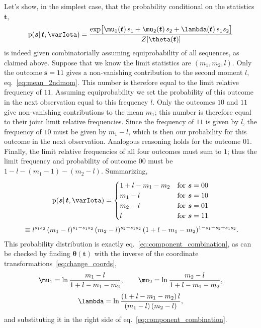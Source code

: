 \documentclass[\ifafour a4paper,12pt,\else a5paper,10pt,\fi%
onecolumn,oneside,article,%
british%
]{memoir}
\theoremstyle{remark}
\theoremstyle{innote}
\newcommand*{\pf}{\mathrm{p}}%
\renewcommand*{\|}{\mathpunct{|}}
\newcommand*{\eqn}{eq.}%
\newcommand*{\yI}{\varIota}
\newcommand*{\ys}{\bm{s}}
\newcommand*{\yso}[1]{\ys^{(#1)}}
\newcommand*{\la}{\lambda}
\newcommand*{\yth}{\bm{\theta}}
\newcommand*{\yt}{\bm{t}}
\begin{document}
Let's show, in the simplest case, that the probability conditional on
the statistics $\yt$,
\begin{equation}
  \label{eq:component_combination}
  \pf(\ys \|\yt, \yI )
  =
  \frac{  \exp\bigl[
    \mu_1(\yt)\, s_1 + \mu_2(\yt)\, s_2 + \la(\yt)\, s_1 s_2
    \bigr] }{Z[\yth(\yt)]}
\end{equation}
is indeed given combinatorially assuming equiprobability of all sequences,
as claimed above. Suppose that we know the limit statistics are
$(m_1, m_2, l)$. Only the outcome $\ys=11$ gives a non-vanishing
contribution to the second moment $l$, \eqn~\eqref{eq:mean_2ndmom}. This
number is therefore equal to the limit relative frequency of $11$. Assuming
equiprobability we set the probability of this outcome in the next
observation equal to this frequency $l$. Only the outcomes $10$ and $11$
give non-vanishing contributions to the mean $m_1$; this number is
therefore equal to their joint limit relative frequencies. Since the
frequency of $11$ is given by $l$, the frequency of $10$ must be given by
$m_1-l$, which is then our probability for this outcome in the next
observation. Analogous reasoning holds for the outcome $01$. Finally, the
limit relative frequencies of all four outcomes must sum to $1$; thus the
limit frequency and probability of outcome $00$ must be
$1-l-(m_1-1)-(m_2-l)$. Summarizing,
\begin{multline}
  \label{eq:prob_outcome_from_statistics}
  \pf(\ys \| \yt,\yI) =
  \begin{cases}
    1+l-m_1-m_2 &\text{for } \ys=00\\
    m_1-l &\text{for } \ys=10\\
    m_2-l &\text{for } \ys=01\\
    l &\text{for } \ys=11
  \end{cases}
  \\[\jot]
  {}\equiv
    l^{s_1 s_2}\,
  (m_1-l)^{s_1-s_1 s_2}\,
  (m_2-l)^{s_2-s_1 s_2}\,
  (1+l-m_1-m_2)^{1-s_1-s_2+s_1 s_2}.
\end{multline}
This probability distribution is exactly
\eqn~\eqref{eq:component_combination}, as can be checked by finding
$\yth(\yt)$ with the inverse of the coordinate
transformations~\eqref{eq:change_coords},
\begin{equation}
  \label{eq:inverse_tranf_coord}
  \begin{gathered}
    \mu_1 =\ln\frac{m_1-l}{1+l-m_1-m_2},\qquad
    \mu_2 =\ln\frac{m_2-l}{1+l-m_1-m_2},\\[\jot]
\la =\ln\frac{(1+l-m_1-m_2)\,l}{(m_1-l)\,(m_2-l)},
\end{gathered}
\end{equation}
and substituting it in the right side of
\eqn~\eqref{eq:component_combination}.
\end{document}
